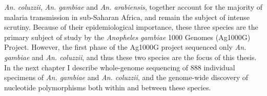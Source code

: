 \documentclass[a4paper,11pt,abstracton,hidelinks]{scrartcl}
\begin{document}
%
\textit{An. coluzzii}, \textit{An. gambiae} and \textit{An. arabiensis}, together account for the majority of malaria transmission in sub-Saharan Africa, and remain the subject of intense scrutiny.
%
Because of their epidemiological importance, these three species are the primary subject of study by the \textit{Anopheles gambiae} 1000 Genomes (Ag1000G) Project. %
However, the first phase of the Ag1000G project sequenced only \textit{An. gambiae} and \textit{An. coluzzii}, and thus these two species are the focus of this thesis. %
In the next chapter I describe whole-genome sequencing of 888 individual specimens of \textit{An. gambiae} and \textit{An. coluzzii}, and the genome-wide discovery of nucleotide polymorphisms both within and between these species. 



\printbibliography
\end{document}
